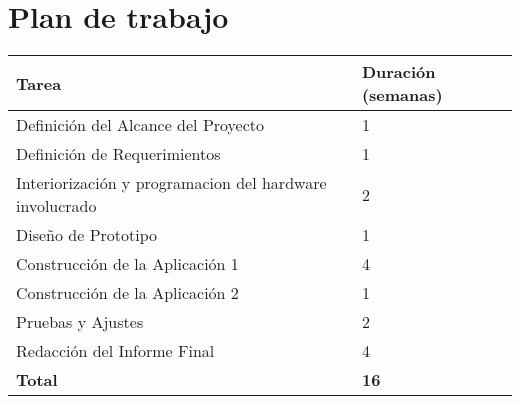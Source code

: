 \chapter{Plan de trabajo}

\begin{table}
\centering
\begin{tabular}[H]{|p{0.8in}|p{3in}|}
\hline
\textbf{Tarea} & \textbf{Duración (semanas)} \\ \hline
Definición del Alcance del Proyecto & 1 \\ \hline
Definición de Requerimientos & 1 \\ \hline
Interiorización y programacion del hardware involucrado & 2 \\ \hline
Diseño de Prototipo & 1 \\ \hline
Construcción de la Aplicación 1 & 4 \\ \hline
Construcción de la Aplicación 2 & 1 \\ \hline
Pruebas y Ajustes & 2 \\ \hline
Redacción del Informe Final & 4 \\ \hline
\textbf{Total} & \textbf{16} \\ \hline
\end{tabular}
\end{table}
